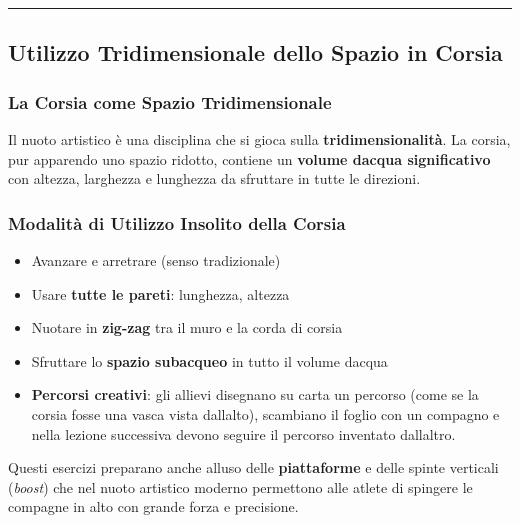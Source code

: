\documentclass[a4paper,11pt]{article}
\providecommand{\tightlist}{%
  \setlength{\itemsep}{0pt}\setlength{\parskip}{0pt}}
\begin{document}
\begin{center}\rule{0.5\linewidth}{0.5pt}\end{center}

\subsection{Utilizzo Tridimensionale dello Spazio in
      Corsia}\label{utilizzo-tridimensionale-dello-spazio-in-corsia}

\subsubsection{La Corsia come Spazio
      Tridimensionale}\label{la-corsia-come-spazio-tridimensionale}

Il nuoto artistico è una disciplina che si gioca sulla
\textbf{tridimensionalità}. La corsia, pur apparendo uno spazio ridotto,
contiene un \textbf{volume d\textquotesingle acqua significativo} con
altezza, larghezza e lunghezza da sfruttare in tutte le direzioni.

\subsubsection{Modalità di Utilizzo Insolito della
      Corsia}\label{modalituxe0-di-utilizzo-insolito-della-corsia}

\begin{itemize}
      \tightlist
      \item
            Avanzare e arretrare (senso tradizionale)
      \item
            Usare \textbf{tutte le pareti}: lunghezza, altezza
      \item
            Nuotare in \textbf{zig-zag} tra il muro e la corda di corsia
      \item
            Sfruttare lo \textbf{spazio subacqueo} in tutto il volume
            d\textquotesingle acqua
      \item
            \textbf{Percorsi creativi}: gli allievi disegnano su carta un percorso
            (come se la corsia fosse una vasca vista dall\textquotesingle alto),
            scambiano il foglio con un compagno e nella lezione successiva devono
            seguire il percorso inventato dall\textquotesingle altro.
\end{itemize}

Questi esercizi preparano anche all\textquotesingle uso delle
\textbf{piattaforme} e delle spinte verticali (\emph{boost}) che nel
nuoto artistico moderno permettono alle atlete di spingere le compagne
in alto con grande forza e precisione.
\end{document}
